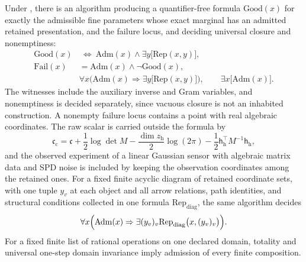 Under , there is an algorithm producing
a quantifier-free formula \(\mathrm{Good}(x)\) for exactly the admissible fine
parameters whose exact marginal has an admitted retained presentation, and the
failure locus, and deciding universal closure and nonemptiness:
\begin{equation}
\begin{aligned}
\mathrm{Good}(x)&\ \Longleftrightarrow\
 \mathrm{Adm}(x)\wedge\exists y\bigl[\mathrm{Rep}(x,y)\bigr],\\
\mathrm{Fail}(x)&=\mathrm{Adm}(x)\wedge\neg\mathrm{Good}(x),\\
&\forall x\bigl(\mathrm{Adm}(x)\Rightarrow\exists y\bigl[\mathrm{Rep}(x,y)\bigr]\bigr),
\qquad
\exists x\bigl[\mathrm{Adm}(x)\bigr].
\end{aligned}
\label{eq:cg-semialgebraic-classification}
\end{equation}
The witnesses include the auxiliary inverse and Gram variables, and
nonemptiness is decided separately, since vacuous closure is not an inhabited
construction. A nonempty failure locus contains a point with real algebraic
coordinates. The raw scalar is carried outside the formula by
\begin{equation}
\mathfrak c_{\mathrm c}
=\mathfrak c+\frac12\log\det M
-\frac{\dim z_{\mathrm h}}{2}\log(2\pi)
-\frac12\mathsf h_{\mathrm h}^\top M^{-1}\mathsf h_{\mathrm h},
\label{eq:cg-semialgebraic-raw-scalar}
\end{equation}
and the observed experiment of a linear Gaussian sensor with algebraic matrix
data and SPD noise is included by keeping the observation coordinates among the
retained ones. For a fixed finite acyclic diagram of retained coordinate sets,
with one tuple \(y_v\) at each object and all arrow relations, path identities,
and structural conditions collected in one formula
\(\mathrm{Rep}_{\mathrm{diag}}\), the same algorithm decides
\begin{equation}
\forall x\Bigl(\mathrm{Adm}(x)\Rightarrow
\exists (y_v)_{v}
\mathrm{Rep}_{\mathrm{diag}}\bigl(x,(y_v)_{v}\bigr)\Bigr).
\label{eq:cg-semialgebraic-diagram}
\end{equation}
For a fixed finite list of rational operations on one declared domain, totality
and universal one-step domain invariance imply admission of every finite
composition. \status{ESTABLISHED}

